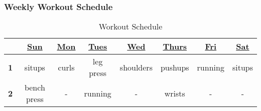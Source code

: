 \begin{frame}
\frametitle{Weekly Workout Schedule} 
\begin{table}[h!]
  \begin{center}
    \begin{tabular}{ | c | c c c c c c c |}
    \hline
       & \underline{Sun} & \underline{Mon} & \underline{Tues} & \underline{Wed} & \underline{Thurs} & \underline{Fri} & \underline{Sat} \\ 
    \hline
    \tiny \textbf{1}  &  \tiny situps  & \tiny curls & \tiny leg press & \tiny shoulders & \tiny pushups & \tiny running & \tiny situps \\
     \tiny \textbf{2} & \tiny bench press & \tiny -  & \tiny running  & \tiny - & \tiny wrists & \tiny -  & \tiny - \\ 
    \hline
    \end{tabular}
  \end{center}
  \caption{Workout Schedule}
\end{table}
\end{frame} 

\begin{comment}

\begin{frame}
\frametitle{Weekly Workout Schedule}
\begin{columns}
\column{0.142857\textwidth}
\centering \underline{Sunday} \\
Bench Press
Situps

\column{0.142857\textwidth}
\centering \underline{Monday} \\
Curls


\column{0.142857\textwidth}
\centering \underline{Tuesday} \\
Leg Press \\
Running


\column{0.142857\textwidth}
\centering \underline{Wednesday} \\
Shoulders \\
Wrists

\column{0.142857\textwidth}
\centering \underline{Thursday} \\
Pushups

\column{0.142857\textwidth}
\centering \underline{Friday} \\ 
Running

\column{0.142857\textwidth}
\centering \underline{Saturday} \\
Situps

\end{columns}
\end{frame}  
\end{comment}

